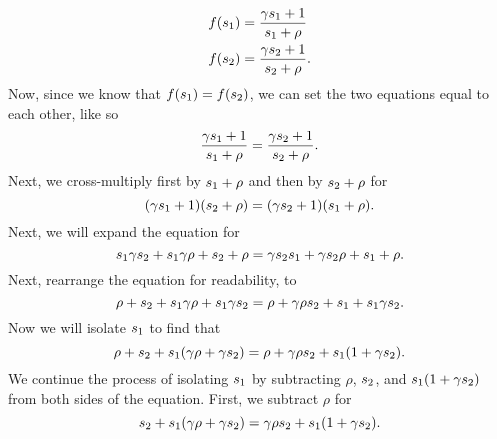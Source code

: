 \documentclass[12pt]{exam}
\begin{document}
\begin{questions}
\begin{align*}
f(s\textsubscript{1}) &= \frac{\gamma s\textsubscript{1} +1}{s\textsubscript{1} + \rho} \\ 
f(s\textsubscript{2}) &= \frac{\gamma s\textsubscript{2} +1}{s\textsubscript{2} + \rho}.
\end{align*}
Now, since we know that $f(s\textsubscript{1}) = f(s\textsubscript{2})$, we can set the two equations equal to each other, like so
\begin{equation*}
\frac{\gamma s\textsubscript{1} +1}{s\textsubscript{1} + \rho}=   \frac{\gamma s\textsubscript{2} +1}{s\textsubscript{2} + \rho}.
\end{equation*}
Next, we cross-multiply first by $s\textsubscript{1} + \rho$ and then by $s\textsubscript{2} + \rho$ for 
\begin{equation*}
(\gamma s\textsubscript{1} +1)(s\textsubscript{2} + \rho)= (\gamma s\textsubscript{2} +1)(s\textsubscript{1} + \rho).
\end{equation*}
Next, we will expand the equation for
\begin{equation*}
s\textsubscript{1}\gamma s\textsubscript{2} + s\textsubscript{1}\gamma \rho +  s\textsubscript{2} + \rho =    \gamma s\textsubscript{2} s\textsubscript{1}+ \gamma s\textsubscript{2}  \rho  + s\textsubscript{1} +\rho.
\end{equation*}
Next, rearrange the equation for readability, to
\begin{equation*}
\rho + s\textsubscript{2} + s\textsubscript{1}\gamma \rho + s\textsubscript{1}\gamma s\textsubscript{2} = \rho + \gamma \rho s\textsubscript{2} + s\textsubscript{1} + s\textsubscript{1} \gamma s\textsubscript{2}.
\end{equation*}
Now we will isolate $s\textsubscript{1}$ to find that
\begin{equation*}
\rho + s\textsubscript{2} + s\textsubscript{1}(\gamma \rho + \gamma s\textsubscript{2}) = \rho + \gamma \rho s\textsubscript{2} + s\textsubscript{1}(1 + \gamma s\textsubscript{2}).
\end{equation*}
We continue the process of isolating $s\textsubscript{1}$ by subtracting $\rho$, $s\textsubscript{2}$, and $s\textsubscript{1}(1+ \gamma s\textsubscript{2})$ from both sides of the equation. First, we subtract $\rho$ for 
\begin{equation*}
s\textsubscript{2} + s\textsubscript{1}(\gamma \rho + \gamma s\textsubscript{2}) = \gamma \rho s\textsubscript{2} + s\textsubscript{1}(1 + \gamma s\textsubscript{2}).
\end{equation*}

\end{questions}
\end{document}
